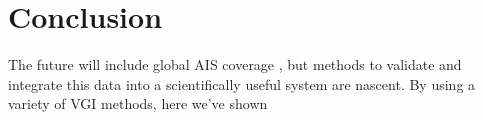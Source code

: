 \section{Conclusion}



The future will include global AIS coverage \cite{JonesGoogle2012,carson2012satellite}, but methods to validate and integrate this data into a scientifically useful system are nascent. By using a variety of VGI methods, here we've shown %



